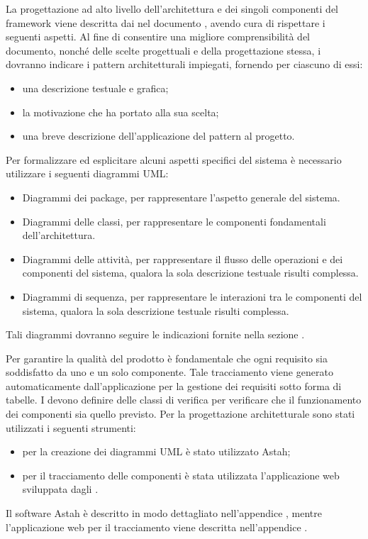La progettazione ad alto livello dell'architettura e dei singoli componenti del framework \projectname{} viene descritta dai  nel documento , avendo cura di rispettare i seguenti aspetti.
Al fine di consentire una migliore comprensibilità del documento, nonché delle scelte progettuali e della progettazione stessa, i  dovranno indicare i pattern architetturali impiegati, fornendo per ciascuno di essi:
\begin{itemize}
\item una descrizione testuale e grafica;
\item la motivazione che ha portato alla sua scelta;
\item una breve descrizione dell'applicazione del pattern al progetto.
\end{itemize}
Per formalizzare ed esplicitare alcuni aspetti specifici del sistema è necessario utilizzare i seguenti diagrammi UML:
\begin{itemize}
\item Diagrammi dei package, per rappresentare l'aspetto generale del sistema.
\item Diagrammi delle classi, per rappresentare le componenti fondamentali dell'architettura.
\item Diagrammi delle attività, per rappresentare il flusso delle operazioni e dei componenti del sistema, qualora la sola descrizione testuale risulti complessa.
\item Diagrammi di sequenza, per rappresentare le interazioni tra le componenti del sistema, qualora la sola descrizione testuale risulti complessa.
\end{itemize}
Tali diagrammi dovranno seguire le indicazioni fornite nella sezione .
				
Per garantire la qualità del prodotto è fondamentale che ogni requisito sia soddisfatto da uno e un solo componente. Tale tracciamento viene generato automaticamente dall'applicazione per la gestione dei requisiti sotto forma di tabelle.
I  devono definire delle classi di verifica per verificare che il funzionamento dei componenti sia quello previsto.
Per la progettazione architetturale sono stati utilizzati i seguenti strumenti:
\begin{itemize}
\item per la creazione dei diagrammi UML è stato utilizzato Astah;
\item per il tracciamento delle componenti è stata utilizzata l'applicazione web sviluppata dagli .
\end{itemize}
Il software Astah è descritto in modo dettagliato nell'appendice , mentre l'applicazione web per il tracciamento viene descritta nell'appendice .



